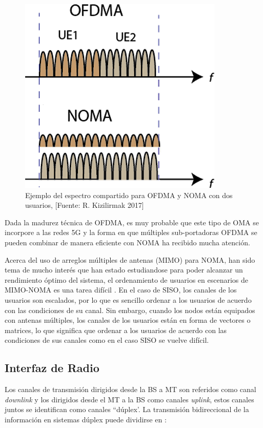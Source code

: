 \begin{figure}[th]
\centering
\includegraphics[scale=1]{Figures/Ejemplo del espectro compartido para OFDMA y NOMA con dos usuarios}
\decoRule
\caption[Ejemplo del espectro compartido para OFDMA y NOMA con dos usuarios.]{Ejemplo del espectro compartido para OFDMA y NOMA con dos usuarios, [Fuente: R. Kizilirmak 2017]}
\label{fig:OFDMANOMA}
\end{figure}

Dada la madurez técnica de OFDMA, es muy probable que este tipo de OMA se incorpore a las redes 5G \parencite{DIng2017} y la forma en que múltiples sub-portadoras OFDMA se pueden combinar de manera eficiente con NOMA ha recibido mucha atención.

Acerca del uso de arreglos múltiples de antenas (MIMO) para NOMA, han sido tema de mucho interés que han estado estudiandose para poder alcanzar un rendimiento óptimo del sistema, el ordenamiento de usuarios en escenarios de MIMO-NOMA es una tarea difícil \parencite{DIng2017}. En el caso de SISO, los canales de los usuarios son escalados, por lo que es sencillo ordenar a los usuarios de acuerdo con las condiciones de su canal. Sin embargo, cuando los nodos están equipados con antenas múltiples, los canales de los usuarios están en forma de vectores o matrices, lo que significa que ordenar a los usuarios de acuerdo con las condiciones de sus canales como en el caso SISO se vuelve difícil. 

\subsection{Interfaz de Radio}
Los canales de transmisión dirigidos desde la BS a MT son referidos como canal \textit{downlink} y los dirigidos desde el MT a la BS como canales \textit{uplink}, estos canales juntos se identifican como canales ``dúplex'. La transmisión bidireccional de la información en sistemas dúplex puede dividirse en \parencite{Correia2018}:


